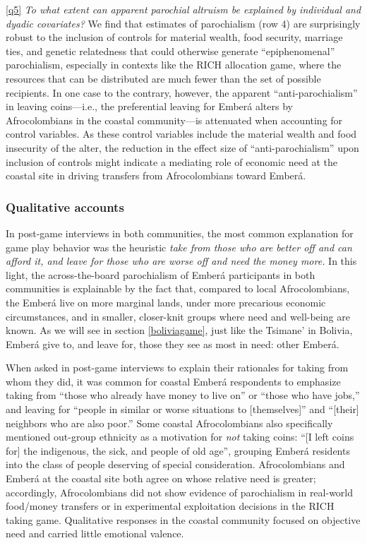 \documentclass[bibauthoryear]{aa}
\begin{document}
\ref{q5} \emph{To what extent can apparent parochial altruism be explained by individual and dyadic covariates?}
We find that estimates of parochialism (row 4) are surprisingly robust to the inclusion of controls for material wealth, food security, marriage ties, and genetic relatedness that could otherwise generate ``epiphenomenal'' parochialism, especially in contexts like the RICH allocation game, where the resources that can be distributed are much fewer than the set of possible recipients. In one case to the contrary, however, the apparent  ``anti-parochialism'' in leaving coins---i.e., the preferential leaving for Ember\'a alters by Afrocolombians in the coastal community---is attenuated when accounting for control variables. As these control variables include the material wealth and food insecurity of the alter, the reduction in the effect size of ``anti-parochialism'' upon inclusion of controls might indicate a mediating role of economic need at the coastal site in driving transfers from Afrocolombians toward Ember\'a.



\subsubsection{Qualitative accounts}\label{qual}
In post-game interviews in both communities, the most common explanation for game play behavior was the heuristic \textit{take from those who are better off and can afford it, and leave for those who are worse off and  need the money more. } In this light, the across-the-board parochialism of Ember\'a participants in both communities is explainable by the fact that, compared to local Afrocolombians, the Ember\'a live on more marginal lands, under more precarious economic circumstances, and in smaller, closer-knit groups where need and well-being are known. As we will see in section \ref{boliviagame}, just like the Tsimane' in Bolivia, Ember\'a give to, and leave for, those they see as most in need: other Ember\'a.

When asked in post-game interviews to explain their rationales for taking from whom they did, it was common for coastal Ember\'a respondents to emphasize taking from ``those who already have money to live on'' or ``those who have jobs,'' and leaving for ``people  in similar or worse situations to [themselves]'' and ``[their] neighbors who are also poor.'' Some coastal Afrocolombians also specifically mentioned out-group ethnicity as a motivation for \textit{not} taking coins: ``[I left coins for] the indigenous, the sick, and people of old age'', grouping Ember\'a residents into the class of people deserving of special consideration. Afrocolombians and Ember\'a at the coastal site both agree on whose relative need is greater; accordingly, Afrocolombians did not show evidence of parochialism in real-world food/money transfers or in experimental exploitation decisions in the RICH taking game. Qualitative responses in the coastal community focused on objective need and carried little emotional valence.
\end{document}
